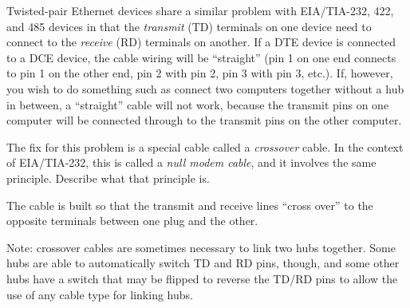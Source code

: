 

Twisted-pair Ethernet devices share a similar problem with EIA/TIA-232, 422, and 485 devices in that the {\it transmit} (TD) terminals on one device need to connect to the {\it receive} (RD) terminals on another.  If a DTE device is connected to a DCE device, the cable wiring will be ``straight'' (pin 1 on one end connects to pin 1 on the other end, pin 2 with pin 2, pin 3 with pin 3, etc.).  If, however, you wish to do something such as connect two computers together without a hub in between, a ``straight'' cable will not work, because the transmit pins on one computer will be connected through to the transmit pins on the other computer.

\vskip 10pt

The fix for this problem is a special cable called a {\it crossover} cable.  In the context of EIA/TIA-232, this is called a {\it null modem cable}, and it involves the same principle.  Describe what that principle is.







The cable is built so that the transmit and receive lines ``cross over'' to the opposite terminals between one plug and the other.







Note: crossover cables are sometimes necessary to link two hubs together.  Some hubs are able to automatically switch TD and RD pins, though, and some other hubs have a switch that may be flipped to reverse the TD/RD pins to allow the use of any cable type for linking hubs.




